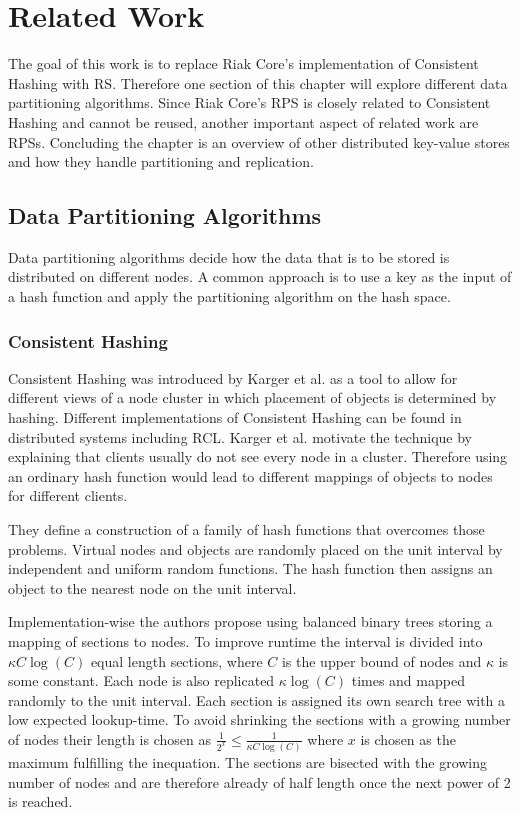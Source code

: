 \chapter{Related Work}
The goal of this work is to replace Riak Core's implementation of Consistent Hashing with \ac{RS}.
Therefore one section of this chapter will explore different data partitioning algorithms.
Since Riak Core's \ac{RPS} is closely related to Consistent Hashing and cannot be reused, another important aspect of related work are \acp{RPS}.
Concluding the chapter is an overview of other distributed key-value stores and how they handle partitioning and replication.

\section{Data Partitioning Algorithms}
Data partitioning algorithms decide how the data that is to be stored is distributed on different \glspl{node}.
A common approach is to use a key as the input of a hash function and apply the partitioning algorithm on the hash space.

\subsection{Consistent Hashing}
\label{sec:consistent_hashing}
Consistent Hashing was introduced by Karger et al.\cite{Karger1997} as a tool to allow for different views of a \gls{node} \gls{cluster} in which placement of objects is determined by hashing.
Different implementations of Consistent Hashing can be found in distributed systems including \ac{RCL}\cite{DeCandia2007}\cite{Lakshman2010}\cite{Fritchie2010}.
Karger et al. motivate the technique by explaining that clients usually do not see every \gls{node} in a cluster.
Therefore using an ordinary hash function would lead to different mappings of objects to \glspl{node} for different clients.

They define a construction of a family of hash functions that overcomes those problems.
Virtual \glspl{node} and objects are randomly placed on the unit interval by independent and uniform random functions.
The hash function then assigns an object to the nearest \gls{node} on the unit interval.

Implementation-wise the authors propose using balanced binary trees storing a mapping of \glspl{section} to \glspl{node}.
To improve runtime the interval is divided into $\kappa C\log(C)$ equal length \glspl{section}, where $C$ is the upper bound of \glspl{node} and $\kappa$ is some constant.
Each \gls{node} is also replicated  $\kappa \log(C)$ times and mapped randomly to the unit interval.
Each \gls{section} is assigned its own search tree with a low expected lookup-time.
To avoid shrinking the \glspl{section} with a growing number of \glspl{node} their length is chosen as $\frac{1}{2^x} \leq \frac{1}{\kappa C\log(C)}$ where $x$ is chosen as the maximum fulfilling the inequation.
The \glspl{section} are bisected with the growing number of \glspl{node} and are therefore already of half length once the next power of 2 is reached.


